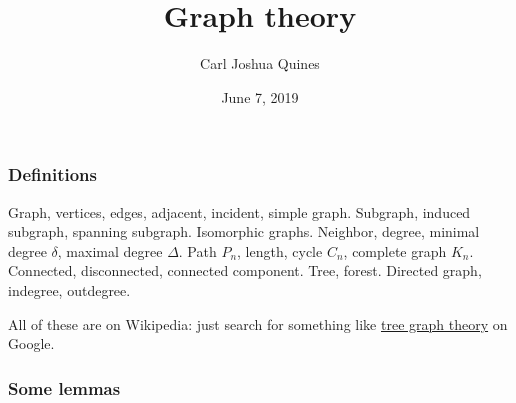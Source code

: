 \documentclass[11pt,paper=letter]{scrartcl}
\begin{document}
\title{Graph theory}
\author{Carl Joshua Quines}
\date{June 7, 2019}

\maketitle

\subsubsection*{Definitions}

Graph, vertices, edges, adjacent, incident, simple graph. Subgraph, induced subgraph, spanning subgraph. Isomorphic graphs. Neighbor, degree, minimal degree $\delta$, maximal degree $\Delta$. Path $P_n$, length, cycle $C_n$, complete graph $K_n$. Connected, disconnected, connected component. Tree, forest. Directed graph, indegree, outdegree.

All of these are on Wikipedia: just search for something like \href{https://www.google.com/search?q=tree+graph+theory}{tree graph theory} on Google.

\subsubsection*{Some lemmas}
\end{document}
